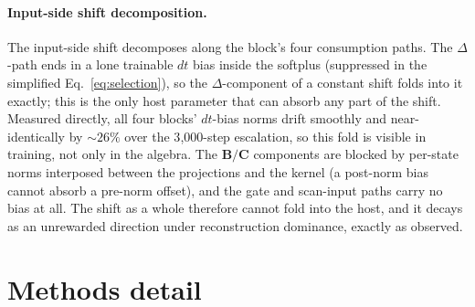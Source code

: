 \documentclass{article}
\begin{document}
\paragraph{Input-side shift decomposition.}
The input-side shift decomposes along the block's four consumption paths. The
$\Delta$-path ends in a lone trainable $dt$ bias inside the softplus (suppressed
in the simplified Eq.~\eqref{eq:selection}), so the $\Delta$-component of a
constant shift folds into it exactly; this is the only host parameter that can
absorb any part of the shift. Measured directly, all four blocks' $dt$-bias norms
drift smoothly and near-identically by ${\sim}26\%$ over the 3{,}000-step
escalation, so this fold is visible in training, not only in the algebra. The
$\mathbf{B}/\mathbf{C}$ components are blocked
by per-state norms interposed between the projections and the kernel (a post-norm
bias cannot absorb a pre-norm offset), and the gate and scan-input paths carry no
bias at all. The shift as a whole therefore cannot fold into the host, and it
decays as an unrewarded direction under reconstruction dominance, exactly as
observed.


\section{Methods detail}\label{app:methods}

\noindent{}
\medskip
\end{document}
